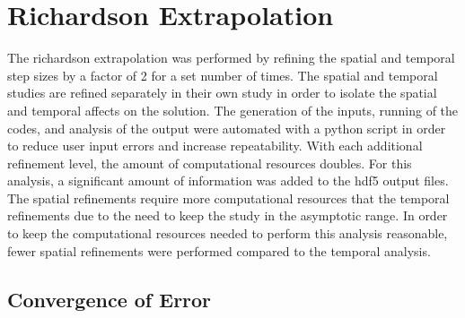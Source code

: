 \documentclass{mc2015}
\begin{document}
%    
%    
%    

\section{Richardson Extrapolation}

The richardson extrapolation was performed by refining the spatial and temporal
step sizes by a factor of 2 for a set number of times. The spatial and temporal
studies are refined separately in their own study in order to isolate the
spatial and temporal affects on the solution. The generation of the inputs,
running of the codes, and analysis of the output were automated with a python
script in order to reduce user input errors and increase repeatability. With
each additional refinement level, the amount of computational resources doubles.
For this analysis, a significant amount of information was added to the hdf5
output files. The spatial refinements require more computational resources
that the temporal refinements due to the need to keep the study in the
asymptotic range. In order to keep the computational resources needed to perform
this analysis reasonable, fewer spatial refinements were performed compared to
the temporal analysis. 

\subsection{Convergence of Error}
\end{document}
